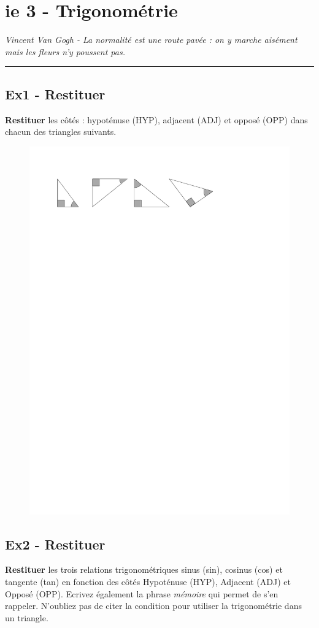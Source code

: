 \documentclass[12pt]{article}
\newcommand{\horrule}[1]{\rule{\linewidth}{#1}} %
\begin{document}
\newpage

\section*{ie 3 - Trigonométrie}
\begin{center}
  \textit{Vincent Van Gogh - La normalité est une route pavée : on y marche aisément mais les fleurs n’y poussent pas.}
\end{center}
\horrule{2px}

\subsection*{Ex1 - Restituer}

\textbf{Restituer} les côtés : hypoténuse (HYP), adjacent (ADJ) et opposé (OPP) dans chacun des triangles suivants.

\begin{figure}[H]
  \centering
  \includegraphics[width=0.6 \linewidth]{4x2-trigonometrie/sources/trigo-ex1b.pdf}
\end{figure}



\subsection*{Ex2 - Restituer}

\textbf{Restituer} les trois relations trigonométriques sinus (sin), cosinus (cos) et tangente (tan) en fonction des côtés Hypoténuse (HYP), Adjacent (ADJ) et Opposé (OPP). Ecrivez également la phrase \textit{mémoire} qui permet de s'en rappeler. N'oubliez pas de citer la condition pour utiliser la trigonométrie dans un triangle.
\end{document}
